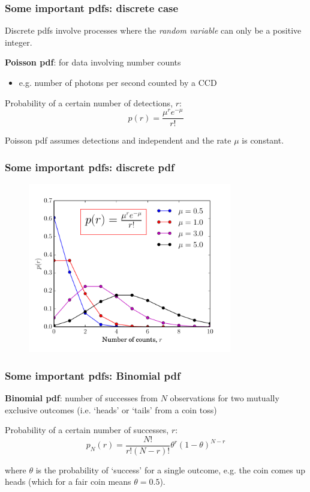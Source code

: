 \begin{frame}

\frametitle{Some important pdfs: discrete case}
\label{someimportantpdfs:discretecase}

Discrete pdfs involve processes where the \emph{random variable} can only be a positive integer.

\textbf{Poisson pdf}: for data involving number counts

\begin{itemize}
\item e.g. number of photons per second counted by a CCD

\end{itemize}

Probability of a certain number of detections, $r$:
\[
\boxed{p(r) = \frac{\mu^r e^{-\mu}}{r!}}
\]

Poisson pdf assumes detections and independent and the rate $\mu$ is constant.

\end{frame}

\begin{frame}

\frametitle{Some important pdfs: discrete pdf}
\label{someimportantpdfs:discretepdf}

\begin{figure}[htbp]
\centering
\includegraphics[keepaspectratio,width=\textwidth,height=210pt]{figures/poisson.pdf}
\label{poisson}
\end{figure}

\end{frame}

\begin{frame}

\frametitle{Some important pdfs: Binomial pdf}
\label{someimportantpdfs:binomialpdf}

\textbf{Binomial pdf}: number of successes from $N$ observations for two mutually exclusive outcomes
(i.e. `heads' or `tails' from a coin toss)

Probability of a certain number of successes, $r$:
\[
\boxed{p_N(r) = \frac{N!}{r!(N-r)!}\theta^r(1-\theta)^{N-r}}
\]

where $\theta$ is the probability of `success' for a single outcome, e.g. the coin comes up heads
(which for a fair coin means $\theta = 0.5$).

\end{frame}

